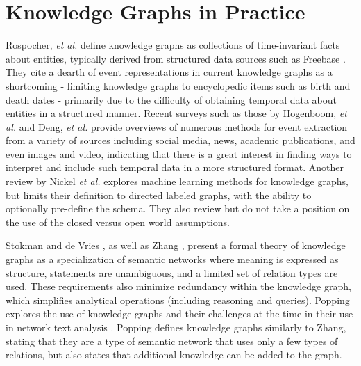 \section{Knowledge Graphs in Practice}
Rospocher, \textit{et al.} define knowledge graphs as collections of time-invariant facts about entities, typically derived from structured data sources such as Freebase \cite{Rospocher2016}. They cite a dearth of event representations in current knowledge graphs as a shortcoming - limiting knowledge graphs to encyclopedic items such as birth and death dates - primarily due to the difficulty of obtaining temporal data about entities in a structured manner. Recent surveys such as those by Hogenboom, \textit{et al.} \cite{Hogenboom2016} and Deng, \textit{et al.} \cite{Deng2015} provide overviews of numerous methods for event extraction from a variety of sources including social media, news, academic publications, and even images and video, indicating that there is a great interest in finding ways to interpret and include such temporal data in a more structured format.
Another review by Nickel \emph{et al.} explores machine learning methods for knowledge graphs, but limits their definition to directed labeled graphs, with the ability to optionally pre-define the schema.
They also review but do not take a position on the use of the closed versus open world assumptions.

Stokman and de Vries \cite{Stokman_1988}, as well as Zhang \cite{zhang2002knowledge}, present a formal theory of knowledge graphs as a specialization of semantic networks where meaning is expressed as structure, statements are unambiguous, and a limited set of relation types are used.
These requirements also minimize redundancy within the knowledge graph, which simplifies analytical operations (including reasoning and queries).
Popping explores the use of knowledge graphs and their challenges at the time in their use in network text analysis \cite{Popping_2003}. 
Popping defines knowledge graphs similarly to Zhang, stating that they are a type of semantic network that uses only a few types of relations, but also states that additional knowledge can be added to the graph.

